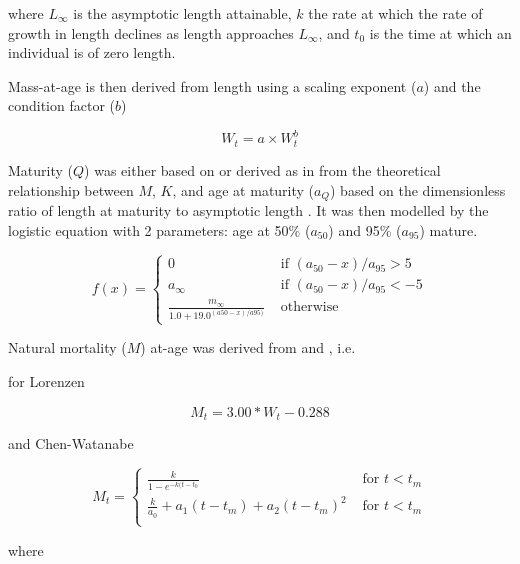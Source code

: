 \documentclass[%
nonumbib,      %
%
]{nrc1}                          %
\begin{document}
where $L_{\infty}$ is the asymptotic length attainable, $k$ the rate at which the rate of growth in length declines as length approaches
$L_{\infty}$, and $t_{0}$ is the time at which an individual is of zero length. 
 
Mass-at-age is then derived from length using a scaling exponent ($a$) and the condition factor ($b$)
 
\begin{equation} W_t = a \times W_t^b \end{equation} 
 
Maturity ($Q$) was either based on \cite{santiago2004dinamica}  or derived as in \cite{williams2003implications} 
from the theoretical relationship between $M$, $K$, and age at maturity ($a_{Q}$)  
based on the dimensionless ratio of length at maturity to asymptotic length \citep{beverton1992patterns}. It was then  
modelled by the logistic equation with 2 parameters: age at 50\% ($a_{50}$) and 95\% ($a_{95}$) mature.

\begin{equation}
f(x) = \left\{ \begin{array}{ll}
			0                                 &\mbox{ if $(a_{50}-x)/a_{95} >  5$} \\
			a_{\infty}                        &\mbox{ if $(a_{50}-x)/a_{95} < -5$} \\
			\frac{m_{\infty}}{1.0+19.0^{(a50-x)/{a95})}} &\mbox{ otherwise}
		\end{array}
       \right.
\end{equation}

Natural mortality ($M$) at-age was derived from \cite{lorenzen2002density} and \cite{chen1989age}, i.e.

for Lorenzen
 
\begin{equation}
   M_t=3.00*W_t-0.288
\end{equation}
   
   and Chen-Watanabe
 
\begin{equation}
M_t = \left\{ \begin{array}{ll}
			 \frac{k}{1-e^{-k(t-t_0}}     			&\mbox{ for $t<t_m$} \\
			\frac{k}{a_0}+a_1(t-t_m)+a_2(t-t_m)^2           &\mbox{ for $t<t_m$} \\
		\end{array}
       \right.
\end{equation}

where
\end{document}
